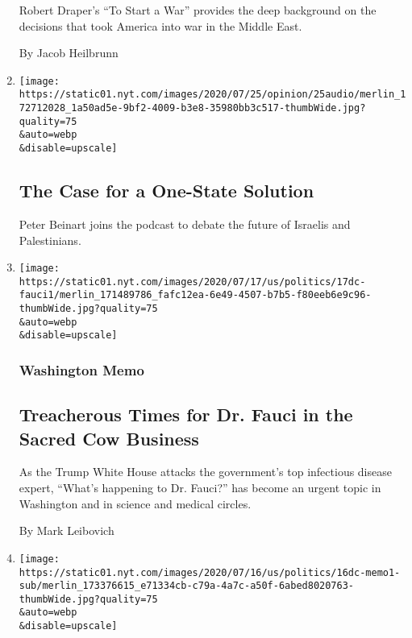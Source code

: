 \begin{enumerate}
  Robert Draper's ``To Start a War'' provides the deep background on the
  decisions that took America into war in the Middle East.

  By Jacob Heilbrunn
\item
  \href{/2020/07/23/opinion/the-argument-israel-palestinian.html}{}

  \texttt{[image: https://static01.nyt.com/images/2020/07/25/opinion/25audio/merlin\_172712028\_1a50ad5e-9bf2-4009-b3e8-35980bb3c517-thumbWide.jpg?quality=75\\\&auto=webp\\\&disable=upscale]}

  \hypertarget{the-case-for-a-one-state-solution}{%
  \subsection{The Case for a One-State
  Solution}\label{the-case-for-a-one-state-solution}}

  Peter Beinart joins the podcast to debate the future of Israelis and
  Palestinians.
\item
  \href{/2020/07/17/us/fauci-trump.html}{}

  \texttt{[image: https://static01.nyt.com/images/2020/07/17/us/politics/17dc-fauci1/merlin\_171489786\_fafc12ea-6e49-4507-b7b5-f80eeb6e9c96-thumbWide.jpg?quality=75\\\&auto=webp\\\&disable=upscale]}

  \hypertarget{washington-memo}{%
  \subsubsection{Washington Memo}\label{washington-memo}}

  \hypertarget{treacherous-times-for-dr-fauci-in-the-sacred-cow-business}{%
  \subsection{Treacherous Times for Dr. Fauci in the Sacred Cow
  Business}\label{treacherous-times-for-dr-fauci-in-the-sacred-cow-business}}

  As the Trump White House attacks the government's top infectious
  disease expert, ``What's happening to Dr. Fauci?'' has become an
  urgent topic in Washington and in science and medical circles.

  By Mark Leibovich
\item
  \href{/2020/07/16/us/politics/trump-republicans.html}{}

  \texttt{[image: https://static01.nyt.com/images/2020/07/16/us/politics/16dc-memo1-sub/merlin\_173376615\_e71334cb-c79a-4a7c-a50f-6abed8020763-thumbWide.jpg?quality=75\\\&auto=webp\\\&disable=upscale]}


\end{enumerate}

